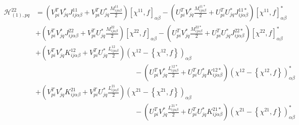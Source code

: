 \documentclass[a4paper,12pt]{book}
\begin{document}
\begin{align*}
\mathcal{H}_{(1),pq}^{22} &= \left(V_{pi}^T V^*_{jq} J_{ij\alpha\beta}^{11} + V_{pi}^T U^*_{jq} \frac{M_{ij\alpha\beta}^{11}}{2} \right)[\chi^{11},f]_{\alpha\beta} -
 \left(U_{pi}^T V^*_{jq} \frac{M_{ij\alpha\beta}^{11*}}{2} + U_{pi}^T U^*_{jq} J_{ij\alpha\beta}^{11*}  \right)[\chi^{11},f]^*_{\alpha\beta} \\
&+ \left(V_{pi}^T V^*_{jq} J_{ij\alpha\beta}^{22} + V_{pi}^T U^*_{jq} \frac{M_{ij\alpha\beta}^{22}}{2} \right)[\chi^{22},f]_{\alpha\beta} -
 \left(U_{pi}^T V^*_{jq} \frac{M_{ij\alpha\beta}^{22*}}{2} + U_{pi}^T U^*_{jq} J_{ij\alpha\beta}^{22*}  \right)[\chi^{22},f]^*_{\alpha\beta} \\
&+ \left(V_{pi}^T V^*_{jq} K_{ij\alpha\beta}^{12} + V_{pi}^T U^*_{jq} \frac{L_{ij\alpha\beta}^{12}}{2} \right)\left(\chi^{12}-\left\{\chi^{12},f\right\}\right)_{\alpha\beta} \\ &\qquad\qquad\qquad\qquad\qquad\qquad\qquad-
 \left(U_{pi}^T V^*_{jq} \frac{L_{ij\alpha\beta}^{12*}}{2} + U_{pi}^T U^*_{jq} K_{ij\alpha\beta}^{12*}  \right)\left(\chi^{12}-\left\{\chi^{12},f\right\}\right)^*_{\alpha\beta} \\
&+ \left(V_{pi}^T V^*_{jq} K_{ij\alpha\beta}^{21} + V_{pi}^T U^*_{jq} \frac{L_{ij\alpha\beta}^{21}}{2} \right)\left(\chi^{21}-\left\{\chi^{21},f\right\}\right)_{\alpha\beta} \\ &\qquad\qquad\qquad\qquad\qquad\qquad\qquad-
 \left(U_{pi}^T V^*_{jq} \frac{L_{ij\alpha\beta}^{21*}}{2} + U_{pi}^T U^*_{jq} K_{ij\alpha\beta}^{21*}  \right)\left(\chi^{21}-\left\{\chi^{21},f\right\}\right)^*_{\alpha\beta}
\end{align*}
\end{document}
